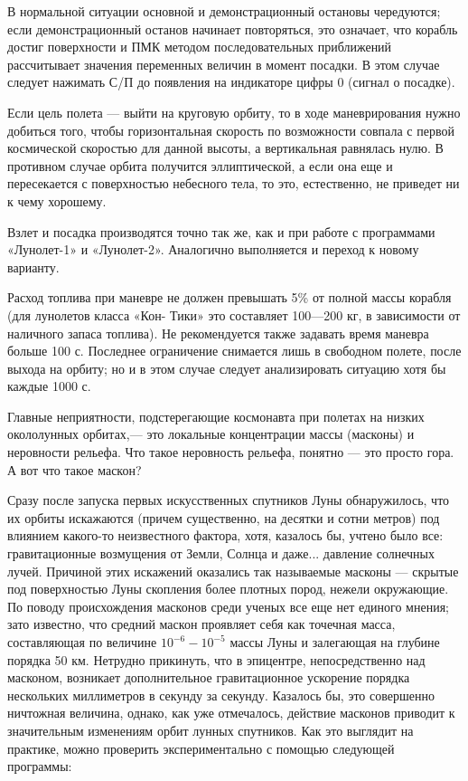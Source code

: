 \documentclass[11pt,a4paper,oneside]{article}
\begin{document}
В нормальной ситуации основной и демонстрационный остановы чередуются; если демонстрационный останов начинает повторяться, это означает, что корабль достиг поверхности и ПМК методом последовательных приближений рассчитывает значения переменных величин в момент посадки. В этом случае следует нажимать С/П до появления на индикаторе цифры 0 (сигнал о посадке).

Если цель полета — выйти на круговую орбиту, то в ходе маневрирования нужно добиться того, чтобы горизонтальная скорость по возможности совпала с первой космической скоростью для данной высоты, а вертикальная равнялась нулю. В противном случае орбита получится эллиптической, а если она еще и пересекается с поверхностью небесного тела, то это, естественно, не приведет ни к чему хорошему.

Взлет и посадка производятся точно так же, как и при работе с программами «Лунолет-1» и «Лунолет-2». Аналогично выполняется и переход к новому варианту.

Расход топлива при маневре не должен превышать 5\% от полной массы корабля (для лунолетов класса «Кон- Тики» это составляет 100—200 кг, в зависимости от наличного запаса топлива). Не рекомендуется также задавать время маневра больше 100 с. Последнее ограничение снимается лишь в свободном полете, после выхода на орбиту; но и в этом случае следует анализировать ситуацию хотя бы каждые 1000 с.

Главные неприятности, подстерегающие космонавта при полетах на низких окололунных орбитах,— это локальные концентрации массы (масконы) и неровности рельефа. Что такое неровность рельефа, понятно — это просто гора. А вот что такое маскон?

Сразу после запуска первых искусственных спутников Луны обнаружилось, что их орбиты искажаются (причем существенно, на десятки и сотни метров) под влиянием какого-то неизвестного фактора, хотя, казалось бы, учтено было все: гравитационные возмущения от Земли, Солнца и даже... давление солнечных лучей. Причиной этих искажений оказались так называемые масконы — скрытые под поверхностью Луны скопления более плотных пород, нежели окружающие. По поводу происхождения масконов среди ученых все еще нет единого мнения; зато известно, что средний маскон проявляет себя как точечная масса, составляющая по величине $10^{-6}-10^{-5}$ массы Луны и залегающая на глубине порядка 50 км. Нетрудно прикинуть, что в эпицентре, непосредственно над масконом, возникает дополнительное гравитационное ускорение порядка нескольких миллиметров в секунду за секунду. Казалось бы, это совершенно ничтожная величина, однако, как уже отмечалось, действие масконов приводит к значительным изменениям орбит лунных спутников. Как это выглядит на практике, можно проверить экспериментально с помощью следующей программы:
\end{document}

